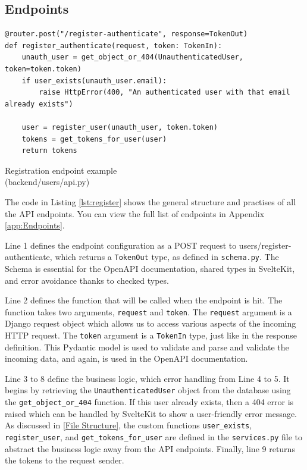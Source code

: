 \subsection{Endpoints}
\begin{listing}[!ht]
\begin{verbatim}
@router.post("/register-authenticate", response=TokenOut)
def register_authenticate(request, token: TokenIn):
    unauth_user = get_object_or_404(UnauthenticatedUser, token=token.token)
    if user_exists(unauth_user.email):
        raise HttpError(400, "An authenticated user with that email already exists")
    
    user = register_user(unauth_user, token.token)
    tokens = get_tokens_for_user(user)
    return tokens
\end{verbatim}
\vspace{-5pt}
\caption{Registration endpoint example\\(backend/users/api.py)}
\label{lst:register}
\end{listing}
\vspace{-5pt}
The code in Listing \ref{lst:register} shows the general structure and practises of all the API endpoints. You can view the full list of endpoints in Appendix \ref{app:Endpoints}. 

Line 1 defines the endpoint configuration as a POST request to users/register-authenticate, which returns a \texttt{TokenOut} type, as defined in \texttt{schema.py}. The Schema is essential for the OpenAPI documentation, shared types in SvelteKit, and error avoidance thanks to checked types.

Line 2 defines the function that will be called when the endpoint is hit. The function takes two arguments, \texttt{request} and \texttt{token}. The \texttt{request} argument is a Django request object which allows us to access various aspects of the incoming HTTP request. The \texttt{token} argument is a \texttt{TokenIn} type, just like in the response definition. This Pydantic model is used to validate and parse and validate the incoming data, and again, is used in the OpenAPI documentation.

Line 3 to 8 define the business logic, which error handling from Line 4 to 5. It begins by retrieving the \texttt{UnauthenticatedUser} object from the database using the \texttt{get\_object\_or\_404} function. If this user already exists, then a 404 error is raised which can be handled by SvelteKit to show a user-friendly error message. As discussed in \ref{File Structure}, the custom functions \texttt{user\_exists}, \texttt{register\_user}, and \texttt{get\_tokens\_for\_user} are defined in the \texttt{services.py} file to abstract the business logic away from the API endpoints. Finally, line 9 returns the tokens to the request sender.

